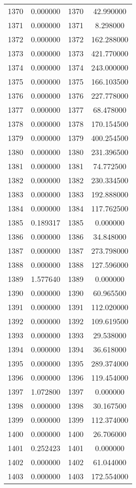 \documentclass[12pt]{article}
\begin{document}
\begin{longtable}{@{}cccc@{}}
1370 & 0.000000 & 1370 & 42.990000 \\
1371 & 0.000000 & 1371 & 8.298000 \\
1372 & 0.000000 & 1372 & 162.288000 \\
1373 & 0.000000 & 1373 & 421.770000 \\
1374 & 0.000000 & 1374 & 243.000000 \\
1375 & 0.000000 & 1375 & 166.103500 \\
1376 & 0.000000 & 1376 & 227.778000 \\
1377 & 0.000000 & 1377 & 68.478000 \\
1378 & 0.000000 & 1378 & 170.154500 \\
1379 & 0.000000 & 1379 & 400.254500 \\
1380 & 0.000000 & 1380 & 231.396500 \\
1381 & 0.000000 & 1381 & 74.772500 \\
1382 & 0.000000 & 1382 & 230.334500 \\
1383 & 0.000000 & 1383 & 192.888000 \\
1384 & 0.000000 & 1384 & 117.762500 \\
1385 & 0.189317 & 1385 & 0.000000 \\
1386 & 0.000000 & 1386 & 34.848000 \\
1387 & 0.000000 & 1387 & 273.798000 \\
1388 & 0.000000 & 1388 & 127.596000 \\
1389 & 1.577640 & 1389 & 0.000000 \\
1390 & 0.000000 & 1390 & 60.965500 \\
1391 & 0.000000 & 1391 & 112.020000 \\
1392 & 0.000000 & 1392 & 109.619500 \\
1393 & 0.000000 & 1393 & 29.538000 \\
1394 & 0.000000 & 1394 & 36.618000 \\
1395 & 0.000000 & 1395 & 289.374000 \\
1396 & 0.000000 & 1396 & 119.454000 \\
1397 & 1.072800 & 1397 & 0.000000 \\
1398 & 0.000000 & 1398 & 30.167500 \\
1399 & 0.000000 & 1399 & 112.374000 \\
1400 & 0.000000 & 1400 & 26.706000 \\
1401 & 0.252423 & 1401 & 0.000000 \\
1402 & 0.000000 & 1402 & 61.044000 \\
1403 & 0.000000 & 1403 & 172.554000 \\

\end{longtable}
\end{document}
